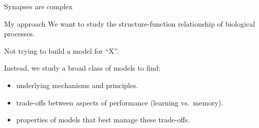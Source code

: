 \documentclass[final]{beamer}%
\begin{document}

\begin{frame}{Synapses are complex}
%
\only<2-3>{
 \parbox[t]{0.225\linewidth}{%
 \texttt{[image: 2000102CobaFig4.pdf]}

 \citerr{Coba2009phosphorylation}
 }
 \hfill
 \parbox[t]{0.45\linewidth}{%
 \hfill
 \texttt{[image: MadisonMontgomery.jpg]}

 \citerr{Montgomery2002765}
 }

 \vp\vp
 \aligntop{\texttt{[image: cascade.svg]}}
 \hp
 \parbox[t]{0.5\linewidth}{
   Capacity \alert{$\propto N^{2/3}$}.
   \citerr{Fusi2005cascade}

   \invisible<2>{
   Capacity \alert{$\propto N$}.
   \citerr{Benna2015complex}
   }
 }
}%
%
\end{frame}


\begin{frame}{My approach}
%
 We want to study the structure-function relationship of biological processes.

 \vp Not trying to build a model for ``X''.

 \vp Instead, we study a broad class of models to find:

 \begin{itemize}
   \item[\lto] underlying mechanisms and principles.

   \vpp\item[\lto] trade-offs between aspects of performance (\eg learning vs.\ memory).

   \vpp\item[\lto] properties of models that best manage these trade-offs.
 \end{itemize}
%
\end{frame}

\end{document}
